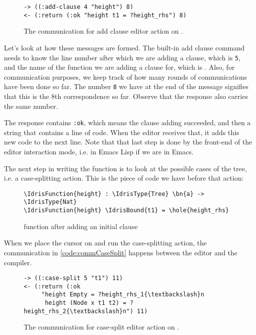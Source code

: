 \begin{figure}[ht]
  \caption{The communication for add clause editor action on .}
  \label{code:commAddClause}
\begin{Verbatim}[framesep=2mm, label=\footnotesize{\normalfont{S-expression}}, labelposition=topline]
-> ((:add-clause 4 "height") 8)
<- (:return (:ok "height t1 = ?height_rhs") 8)
\end{Verbatim}
\end{figure}

Let's look at how these messages are formed. The built-in add clause command
needs to know the line number after which we are adding a clause, which is
\texttt{5}, and the name of the function we are adding a clause for, which is
.
Also, for communication purposes, we keep track of how many rounds of
communications have been done so far. The number \texttt{8} we have at the end
of the message signifies that this is the 8th correspondence so far.
Observe that the response also carries the same number.

The response contains \texttt{:ok}, which means the clause adding succeeded,
and then a string that contains a line of code.
When the editor receives that, it adds this new code to the next
line. Note that that last step is done by the front-end of the editor
interaction mode, i.e. in Emacs Lisp if we are in Emacs.

The next step in writing the function  is to look at the possible
cases of the tree, i.e. a case-splitting action. This is the piece of code we
have before that action:

\begin{figure}[ht]
  \caption{ function after adding an initial clause}
\begin{Verbatim}[framesep=2mm, label=\footnotesize{\normalfont{Idris}}, labelposition=topline]
\IdrisFunction{height} : \IdrisType{Tree} \bn{a} -> \IdrisType{Nat}
\IdrisFunction{height} \IdrisBound{t1} = \hole{height_rhs}
\end{Verbatim}
\end{figure}

When we place the cursor on  and run the case-splitting action, the
communication in \autoref{code:commCaseSplit} happens between the editor and
the compiler.

\begin{figure}[ht]
\caption{The communication for case-split editor action on .}
\label{code:commCaseSplit}
\begin{Verbatim}[framesep=2mm, label=\footnotesize{\normalfont{S-expression}}, labelposition=topline]
-> ((:case-split 5 "t1") 11)
<- (:return (:ok
     "height Empty = ?height_rhs_1{\textbackslash}n
      height (Node x t1 t2) = ?height_rhs_2{\textbackslash}n") 11)
\end{Verbatim}
\end{figure}

